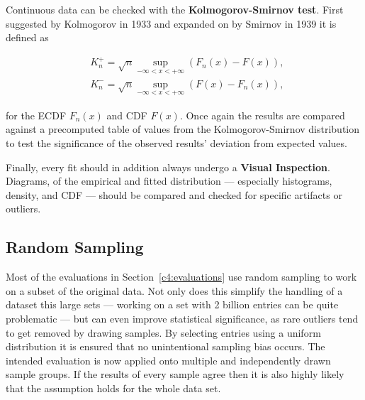 Continuous data can be checked with the \textbf{Kolmogorov-Smirnov test}. First suggested by Kolmogorov in 1933 \cite{kolmogorov1933sulla} and expanded on by Smirnov in 1939 \cite{smirnov1939estimation} it is defined as

\begin{equation}
	\begin{aligned}
	\phantom{,}K_n^+ = \sqrt{n} \sup_{-\infty < x < + \infty} \left( F_n(x) - F(x) \right)\text{,} \\
	\phantom{,}K_n^- = \sqrt{n} \sup_{-\infty < x < + \infty} \left( F(x) - F_n(x) \right)\text{,}
	\end{aligned}
\end{equation}

for the \gls{ECDF} $F_n(x)$ and \gls{CDF} $F(x)$. Once again the results are compared against a precomputed table of values from the Kolmogorov-Smirnov distribution to test the significance of the observed results' deviation from expected values. 

Finally, every fit should in addition always undergo a \textbf{Visual Inspection}. Diagrams, of the empirical and fitted distribution --- especially histograms, density, and \gls{CDF} --- should be compared and checked for specific artifacts or outliers. 



\subsection{Random Sampling}

Most of the evaluations in Section~\ref{c4:evaluations} use random sampling to work on a subset of the original data.  Not only does this simplify the handling of a dataset this large sets --- working on a set with 2 billion entries can be quite problematic --- but can even improve statistical significance, as rare outliers tend to get removed by drawing samples. By selecting entries using a uniform distribution it is ensured that no unintentional sampling bias occurs. The intended evaluation is now applied onto multiple and independently drawn sample groups. If the results of every sample agree then it is also highly likely that the assumption holds for the whole data set.


